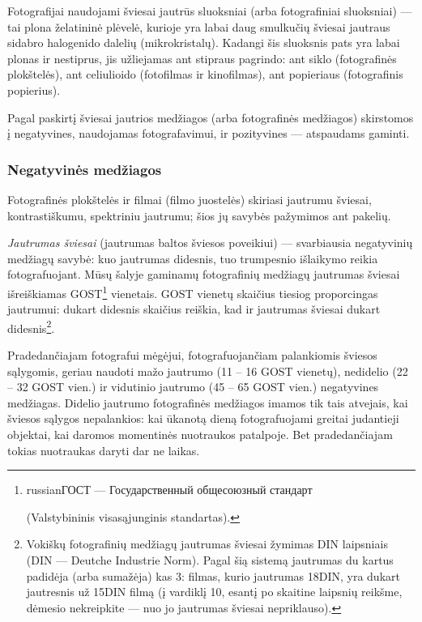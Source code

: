 \documentclass{book}
\begin{document}
				Fotografijai naudojami šviesai jautrūs sluoksniai (arba fotografiniai sluoksniai) --- tai plona želatininė plėvelė, kurioje yra labai daug smulkučių šviesai jautraus sidabro halogenido dalelių (mikrokristalų). Kadangi šis sluoksnis pats yra labai plonas ir nestiprus, jis užliejamas ant stipraus pagrindo: ant siklo (fotografinės plokštelės), ant celiulioido (fotofilmas ir kinofilmas), ant popieriaus (fotografinis popierius).

				Pagal paskirtį šviesai jautrios medžiagos (arba fotografinės medžiagos) skirstomos į negatyvines, naudojamas fotografavimui, ir pozityvines --- atspaudams gaminti.

				\subsubsection*{Negatyvinės medžiagos}
					Fotografinės plokštelės ir filmai (filmo juostelės) skiriasi jautrumu šviesai, kontrastiškumu, spektriniu jautrumu; šios jų savybės pažymimos ant pakelių.

					\textit{Jautrumas šviesai} (jautrumas baltos šviesos poveikiui) --- svarbiausia negatyvinių medžiagų savybė: kuo jautrumas didesnis, tuo trumpesnio išlaikymo reikia fotografuojant. Mūsų šalyje gaminamų fotografinių medžiagų jautrumas šviesai išreiškiamas GOST\footnote{\begin{otherlanguage*}{russian}ГОСТ --- Государственный общесоюзный стандарт\end{otherlanguage*} (Valstybininis visasąjunginis standartas).} vienetais. GOST vienetų skaičius tiesiog proporcingas jautrumui: dukart didesnis skaičius reiškia, kad ir jautrumas šviesai dukart didesnis\footnote{Vokiškų fotografinių medžiagų jautrumas šviesai žymimas DIN laipsniais (DIN --- Deutche Industrie Norm). Pagal šią sistemą jautrumas du kartus padidėja (arba sumažėja) kas 3\degree: filmas, kurio jautrumas 18\degree DIN, yra dukart jautresnis už 15\degree DIN filmą (į vardiklį 10, esantį po skaitine laipsnių reikšme, dėmesio nekreipkite --- nuo jo jautrumas šviesai nepriklauso).}.

					Pradedančiajam fotografui mėgėjui, fotografuojančiam palankiomis šviesos sąlygomis, geriau naudoti mažo jautrumo (11 -- 16 GOST vienetų), nedidelio (22 -- 32 GOST vien.) ir vidutinio jautrumo (45 -- 65 GOST vien.) negatyvines medžiagas. Didelio jautrumo fotografinės medžiagos imamos tik tais atvejais, kai šviesos sąlygos nepalankios: kai ūkanotą dieną fotografuojami greitai judantieji objektai, kai daromos momentinės nuotraukos patalpoje. Bet pradedančiajam tokias nuotraukas daryti dar ne laikas.
\end{document}
